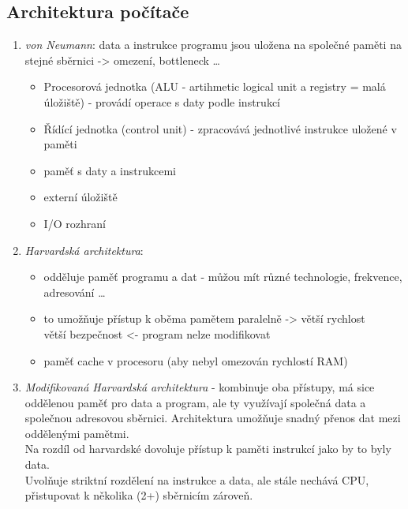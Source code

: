 \documentclass[12pt]{article}
\begin{document}
\subsection{Architektura počítače}
\begin{enumerate}
\item \emph{von Neumann}: data a instrukce programu jsou uložena na společné paměti na stejné sběrnici -> omezení, bottleneck \dots
\begin{itemize}
\item Procesorová jednotka (ALU - artihmetic logical unit a registry = malá úložiště) - provádí operace s daty podle instrukcí
\item Řídící jednotka (control unit) - zpracovává jednotlivé instrukce uložené v paměti
\item paměť s daty a instrukcemi
\item externí úložiště
\item I/O rozhraní
\end{itemize} 
\item \emph{Harvardská architektura}:
\begin{itemize}
\item odděluje paměť programu a dat - můžou mít různé technologie, frekvence, adresování \dots
\item to umožňuje přístup k oběma pamětem paralelně -> větší rychlost\\ větší bezpečnost <- program nelze modifikovat
\item paměť cache v procesoru (aby nebyl omezován rychlostí RAM)
\end{itemize}
\item \emph{Modifikovaná Harvardská architektura} - kombinuje oba přístupy, má sice oddělenou paměť pro data a program, ale ty využívají společná data a společnou adresovou sběrnici. Architektura umožňuje snadný přenos dat mezi oddělenými pamětmi.\\
Na rozdíl od harvardské dovoluje přístup k paměti instrukcí jako by to byly data.\\
Uvolňuje striktní rozdělení na instrukce a data, ale stále nechává CPU, přistupovat k několika (2+) sběrnicím zároveň.
\end{enumerate}
\end{document}

